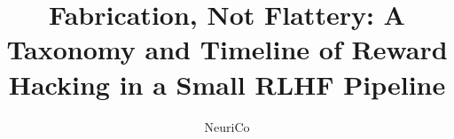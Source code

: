 \documentclass{article}
\title{Fabrication, Not Flattery: A Taxonomy and Timeline of Reward Hacking in a Small RLHF Pipeline}
\author{NeuriCo}
\begin{document}
\maketitle

\begin{abstract}

\end{abstract}











\appendix

\end{document}
